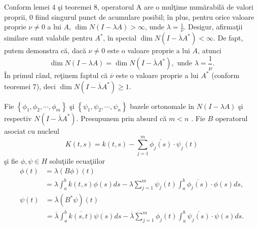 \documentclass[a4paper,12pt,oneside]{report}
\begin{document}
\noindent Conform lemei 4 \c{s}i teoremei 8, operatorul A are o mul\c{t}ime num\u{a}rabil\u{a} de valori proprii,   \(0\) fiind singurul punct de acumulare posibil; \^{i}n plus, pentru orice valoare proprie \(\nu \neq 0\) a lui \(A\), \(\dim N\left ( I-\lambda A \right )> \infty\), unde \(\lambda = \frac{1}{\nu }\). Desigur, afirma\c{t}ii similare sunt valabile pentru \(A^{\ast }\), \^{i}n special \(\dim N\left ( I-\overline{\lambda }A^{\ast } \right )< \infty\). De fapt, putem demonstra c\u{a}, dac\u{a} \(\nu \neq 0\) este o valoare proprie a lui \(A\), atunci
\begin{displaymath}
\dim N\left ( I-\lambda A \right ) = \dim N\left ( I - \overline{\lambda } A^{\ast }\right ), \text{ unde } \lambda  = \frac{1}{\nu }. \label{eq:2.24} \tag{2.24}
\end{displaymath}
\^{I}n primul r\^{a}nd, re\c{t}inem faptul c\u{a} \(\overline{\nu }\) este o valoare proprie a lui \(A^{\ast }\) (conform teoremei 7), deci \(\dim N\left ( I - \overline{\lambda }A^{\ast } \right )\geq 1\).

Fie \(\left \{ \phi _{1}, \phi _{2},\cdots,\phi _{m} \right \}\) \c{s}i \(\left \{ \psi _{1}, \psi _{2},\cdots,\psi _{n} \right \}\)  bazele ortonomale \^{i}n \(N \left ( I-\lambda A \right )\) \c{s}i respectiv \(N \left ( I-\overline{\lambda} A^{\ast } \right )\). Presupunem prin absurd c\u{a} \(m< n\) . Fie \(B\) operatorul asociat cu nucleul
\begin{displaymath}
K\left ( t,s \right ) = k\left ( t,s \right ) - \sum_{j=1}^{m}\overline{\phi _{j}\left ( s \right )}\cdot \psi _{j} \left ( t \right )
\end{displaymath}
\c{s}i fie \(\phi , \psi  \in H\) solu\c{t}iile ecua\c{t}iilor
\begin{equation} \label{eq:2.25} \tag{2.25}
    \begin{split}
        \phi \left ( t \right ) & = \lambda \left ( B\phi  \right )\left ( t \right ) \\ & = \lambda \int_{a}^{b} k\left ( t,s \right )\phi \left ( s \right )ds - \lambda \sum_{j=1}^{m}\psi _{j}\left ( t \right )\int_{a}^{b}\overline{\phi _{j}\left ( s \right )}\cdot \phi \left ( s \right )ds,
    \end{split}
\end{equation}
\begin{equation} \label{eq:2.26} \tag{2.26}
    \begin{split}
        \psi  \left ( t \right )  & = \overline{\lambda} \left ( B^{\ast }\psi  \right )\left ( t \right )  \\ & = \overline{\lambda }\int_{a}^{b}\overline{k\left ( s,t \right )}\psi \left ( s \right )ds - \overline{\lambda }\sum_{j=1}^{m}\phi _{j}\left ( t \right )\int_{a}^{b}\overline{\psi _{j}\left ( s \right )}\cdot \psi \left ( s \right )ds.
    \end{split}
\end{equation}
\end{document}
